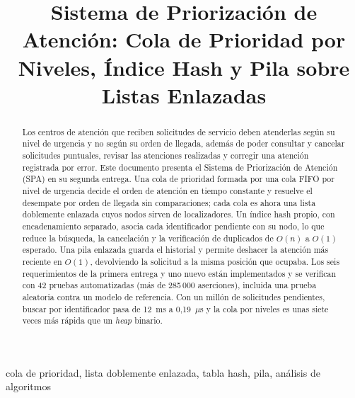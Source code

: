 \documentclass[conference]{IEEEtran}
\title{
Sistema de Priorización de Atención: Cola de Prioridad por Niveles,
Índice Hash y Pila sobre Listas Enlazadas
}
\author{
\IEEEauthorblockN{
Johan Adrian Torres Robles,
Esteban Mora Lopez,
Miguel Angel Rodriguez Bohorquez
}
\IEEEauthorblockA{
\textit{Universidad Nacional de Colombia}\\
\textit{Sede Bogotá}\\
Bogotá D.C., Colombia\\
\{jotorresro, emoral, mrodriguezbo\}@unal.edu.co
}
}
\begin{document}
\maketitle


\begin{abstract}
Los centros de atención que reciben solicitudes de servicio deben atenderlas
según su nivel de urgencia y no según su orden de llegada, además de poder
consultar y cancelar solicitudes puntuales, revisar las atenciones
realizadas y corregir una atención registrada por error. Este documento
presenta el Sistema de Priorización de Atención (SPA) en su segunda
entrega. Una cola de prioridad formada por una cola FIFO por nivel de
urgencia decide el orden de atención en tiempo constante y resuelve el
desempate por orden de llegada sin comparaciones; cada cola es ahora una
lista doblemente enlazada cuyos nodos sirven de localizadores. Un índice
hash propio, con encadenamiento separado, asocia cada identificador
pendiente con su nodo, lo que reduce la búsqueda, la cancelación y la
verificación de duplicados de $O(n)$ a $O(1)$ esperado. Una pila enlazada
guarda el historial y permite deshacer la atención más reciente en $O(1)$,
devolviendo la solicitud a la misma posición que ocupaba. Los seis
requerimientos de la primera entrega y uno nuevo están implementados y se
verifican con 42 pruebas automatizadas (más de 285\,000 aserciones),
incluida una prueba aleatoria contra un modelo de referencia. Con un millón
de solicitudes pendientes, buscar por identificador pasa de 12~ms a 0{,}19~$\mu$s
y la cola por niveles es unas siete veces más rápida que un \emph{heap}
binario.
\end{abstract}

\begin{IEEEkeywords}
cola de prioridad, lista doblemente enlazada, tabla hash, pila, análisis
de algoritmos
\end{IEEEkeywords}











\end{document}
